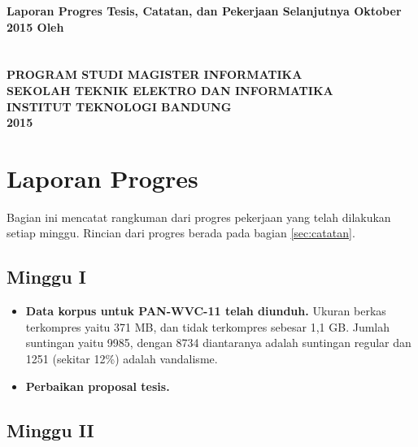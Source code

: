 



\thispagestyle{empty}
\begin{center}
	\textbf{%
		\mytitle
		\vfill
		Laporan Progres Tesis, Catatan, dan Pekerjaan Selanjutnya
		\linebreak
		 Oktober 2015
		\vfill
		Oleh \\
		\myname \\
		\mysid \\
		\vfill
		\uppercase{%
			Program Studi Magister Informatika \\
			Sekolah Teknik Elektro dan Informatika \\
			Institut Teknologi Bandung \\
			2015
		}
	}
\end{center}
\newpage

\section{Laporan Progres}

Bagian ini mencatat rangkuman dari progres pekerjaan yang telah dilakukan setiap minggu.
Rincian dari progres berada pada bagian \ref{sec:catatan}.

\subsection{Minggu I}

\begin{itemize}
	\item \textbf{Data korpus untuk PAN-WVC-11 telah diunduh.}
Ukuran berkas terkompres yaitu 371 MB, dan tidak terkompres sebesar 1,1 GB.
Jumlah suntingan yaitu 9985, dengan 8734 diantaranya adalah suntingan regular dan 1251 (sekitar 12\%) adalah vandalisme.

	\item \textbf{Perbaikan proposal tesis.}
\end{itemize}

\subsection{Minggu II}

